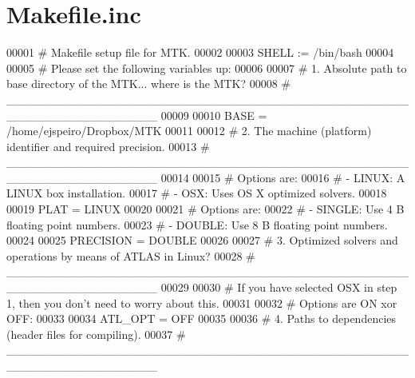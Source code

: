 \hypertarget{Makefile_8inc_source}{\section{Makefile.\-inc}
}

\begin{DoxyCode}
00001 \textcolor{preprocessor}{# Makefile setup file for MTK.}
00002 \textcolor{preprocessor}{}
00003 SHELL := /bin/bash
00004 
00005 \textcolor{preprocessor}{# Please set the following variables up:}
00006 \textcolor{preprocessor}{}
00007 \textcolor{preprocessor}{#   1. Absolute path to base directory of the MTK... where is the MTK?}
00008 \textcolor{preprocessor}{}\textcolor{preprocessor}{#   \_\_\_\_\_\_\_\_\_\_\_\_\_\_\_\_\_\_\_\_\_\_\_\_\_\_\_\_\_\_\_\_\_\_\_\_\_\_\_\_\_\_\_\_\_\_\_\_\_\_\_\_\_\_\_\_\_\_\_\_\_\_\_\_\_\_}
00009 \textcolor{preprocessor}{}
00010 BASE = /home/ejspeiro/Dropbox/MTK
00011 
00012 \textcolor{preprocessor}{#   2. The machine (platform) identifier and required precision.}
00013 \textcolor{preprocessor}{}\textcolor{preprocessor}{#   \_\_\_\_\_\_\_\_\_\_\_\_\_\_\_\_\_\_\_\_\_\_\_\_\_\_\_\_\_\_\_\_\_\_\_\_\_\_\_\_\_\_\_\_\_\_\_\_\_\_\_\_\_\_\_\_\_\_\_\_\_\_\_\_\_\_}
00014 \textcolor{preprocessor}{}
00015 \textcolor{preprocessor}{# Options are:}
00016 \textcolor{preprocessor}{}\textcolor{preprocessor}{# - LINUX: A LINUX box installation.}
00017 \textcolor{preprocessor}{}\textcolor{preprocessor}{# - OSX: Uses OS X optimized solvers.}
00018 \textcolor{preprocessor}{}
00019 PLAT = LINUX
00020 
00021 \textcolor{preprocessor}{# Options are:}
00022 \textcolor{preprocessor}{}\textcolor{preprocessor}{# - SINGLE: Use 4 B floating point numbers.}
00023 \textcolor{preprocessor}{}\textcolor{preprocessor}{# - DOUBLE: Use 8 B floating point numbers.}
00024 \textcolor{preprocessor}{}
00025 PRECISION = DOUBLE
00026 
00027 \textcolor{preprocessor}{#   3. Optimized solvers and operations by means of ATLAS in Linux?}
00028 \textcolor{preprocessor}{}\textcolor{preprocessor}{#   \_\_\_\_\_\_\_\_\_\_\_\_\_\_\_\_\_\_\_\_\_\_\_\_\_\_\_\_\_\_\_\_\_\_\_\_\_\_\_\_\_\_\_\_\_\_\_\_\_\_\_\_\_\_\_\_\_\_\_\_\_\_\_\_\_\_}
00029 \textcolor{preprocessor}{}
00030 \textcolor{preprocessor}{# If you have selected OSX in step 1, then you don't need to worry about this.}
00031 \textcolor{preprocessor}{}
00032 \textcolor{preprocessor}{# Options are ON xor OFF:}
00033 \textcolor{preprocessor}{}
00034 ATL\_OPT = OFF
00035 
00036 \textcolor{preprocessor}{#   4. Paths to dependencies (header files for compiling).}
00037 \textcolor{preprocessor}{}\textcolor{preprocessor}{#   \_\_\_\_\_\_\_\_\_\_\_\_\_\_\_\_\_\_\_\_\_\_\_\_\_\_\_\_\_\_\_\_\_\_\_\_\_\_\_\_\_\_\_\_\_\_\_\_\_\_\_\_\_\_\_\_\_\_\_\_\_\_\_\_\_\_}

\end{DoxyCode}
